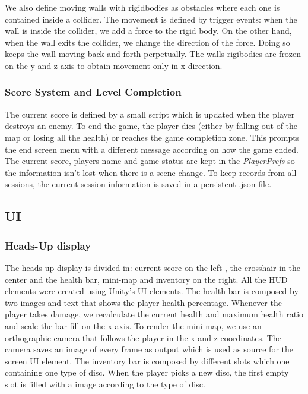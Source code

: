 \documentclass[a4paper]{article}
\begin{document}
     We also define moving walls with rigidbodies as obstacles where each one is contained inside a collider. The movement is defined by trigger events: when the wall is inside the collider, we add a force to the rigid body. On the other hand, when the wall exits the collider, we change the direction of the force. Doing so keeps the wall moving back and forth perpetually.
     The walls rigibodies are frozen on the y and z axis to obtain movement only in x direction.
     
     
    \subsubsection{Score System and Level Completion}
   The current score is defined by a small script which is updated when the player destroys an enemy. To end the game, the player dies (either by falling out of the map or losing all the health) or reaches the game completion zone.
   This prompts the end screen menu with a different message according on how the game ended.
   The current score, players name and game status are kept in the \textit{PlayerPrefs} so the information isn't lost when there is a scene change. To keep records from all sessions, the current session information is saved in a persistent .json file.

\subsection{UI}
	\subsubsection{Heads-Up display}
    The heads-up display is divided in: current score on the left , the crosshair in the center and  the health bar, mini-map and inventory on the right. All the HUD elements were created using Unity's UI elements.	   
   The health bar is composed by two images and text that shows the player health percentage. Whenever the player takes damage, we recalculate the current health and maximum health ratio and scale the bar fill on the x axis. To render the mini-map, we use an orthographic camera that follows the player in the x and z coordinates. The camera saves an image of every frame as output which is used as source for the screen UI element.
   The inventory bar is composed by different slots which one containing one type of disc. When the player picks a new disc, the first empty slot is filled with a image according to the type of disc.   
    
\end{document}

